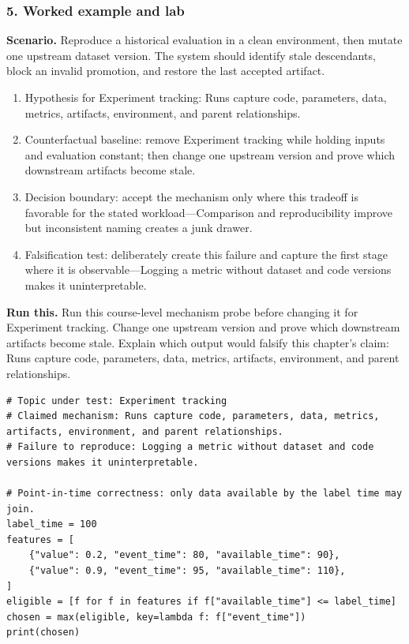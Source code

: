 \subsubsection*{5. Worked example and lab}
\textbf{Scenario.} Reproduce a historical evaluation in a clean environment, then mutate one upstream dataset version. The system should identify stale descendants, block an invalid promotion, and restore the last accepted artifact.
\begin{enumerate}
\item Hypothesis for Experiment tracking: Runs capture code, parameters, data, metrics, artifacts, environment, and parent relationships.
\item Counterfactual baseline: remove Experiment tracking while holding inputs and evaluation constant; then change one upstream version and prove which downstream artifacts become stale.
\item Decision boundary: accept the mechanism only where this tradeoff is favorable for the stated workload—Comparison and reproducibility improve but inconsistent naming creates a junk drawer.
\item Falsification test: deliberately create this failure and capture the first stage where it is observable—Logging a metric without dataset and code versions makes it uninterpretable.
\end{enumerate}
\textbf{Run this.} Run this course-level mechanism probe before changing it for Experiment tracking. Change one upstream version and prove which downstream artifacts become stale. Explain which output would falsify this chapter's claim: Runs capture code, parameters, data, metrics, artifacts, environment, and parent relationships.
\begin{Verbatim}[fontsize=\scriptsize]
# Topic under test: Experiment tracking
# Claimed mechanism: Runs capture code, parameters, data, metrics, artifacts, environment, and parent relationships.
# Failure to reproduce: Logging a metric without dataset and code versions makes it uninterpretable.

# Point-in-time correctness: only data available by the label time may join.
label_time = 100
features = [
    {"value": 0.2, "event_time": 80, "available_time": 90},
    {"value": 0.9, "event_time": 95, "available_time": 110},
]
eligible = [f for f in features if f["available_time"] <= label_time]
chosen = max(eligible, key=lambda f: f["event_time"])
print(chosen)
\end{Verbatim}
